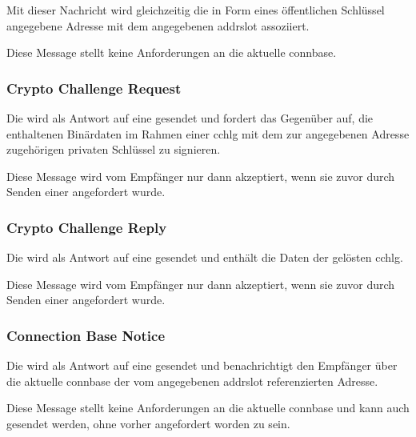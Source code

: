 Mit dieser Nachricht wird gleichzeitig die in Form eines öffentlichen Schlüssel angegebene Adresse
mit dem angegebenen \gls{addrslot} assoziiert.

Diese Message stellt keine Anforderungen an die aktuelle \gls{connbase}.

\isprototsbytefield


\subsubsection{Crypto Challenge Request}
\label{dcl-isproto-ccreq}
Die \msg{\isprotoccreq} wird als Antwort auf eine \msg{\isprotots} gesendet und fordert das Gegenüber
auf, die enthaltenen Binärdaten im Rahmen einer \gls{cchlg} mit dem zur angegebenen Adresse
zugehörigen privaten Schlüssel zu signieren.

Diese Message wird vom Empfänger nur dann akzeptiert, wenn sie zuvor durch Senden einer
\msg{\isprotots} angefordert wurde.

\isprotoccreqbytefield


\subsubsection{Crypto Challenge Reply}
\label{dcl-isproto-ccrep}
Die \msg{\isprotoccrep} wird als Antwort auf eine \msg{\isprotoccreq} gesendet und enthält die Daten
der gelösten \gls{cchlg}.

Diese Message wird vom Empfänger nur dann akzeptiert, wenn sie zuvor durch Senden einer
\msg{\isprotoccreq} angefordert wurde.

\isprotoccrepbytefield


\subsubsection{Connection Base Notice}
\label{dcl-isproto-cbn}
Die \msg{\isprotocbn} wird als Antwort auf eine \msg{\isprotoccrep} gesendet und benachrichtigt
den Empfänger über die aktuelle \gls{connbase} der vom angegebenen \gls{addrslot} referenzierten
Adresse.

Diese Message stellt keine Anforderungen an die aktuelle \gls{connbase} und kann auch gesendet
werden, ohne vorher angefordert worden zu sein.

\isprotocbnbytefield


